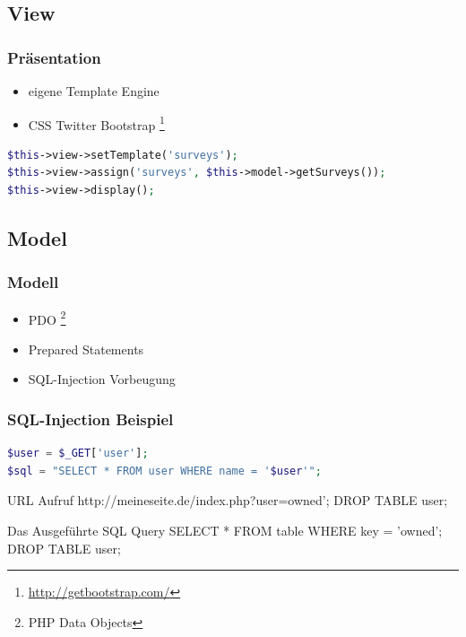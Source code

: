 \documentclass[xcolor=dvipsnames]{beamer}
\begin{document}
\subsection{View}
\begin{frame}[fragile] %
  \frametitle{Präsentation} %
  \begin{block}{}
	  \begin{itemize}
  		\item eigene Template Engine
  		\item CSS Twitter Bootstrap \footnote{\url{http://getbootstrap.com/}}
	  \end{itemize}
  \end{block}
  
\begin{lstlisting}[language=PHP, caption=Template Engine]
$this->view->setTemplate('surveys');
$this->view->assign('surveys', $this->model->getSurveys());
$this->view->display();
\end{lstlisting} 

\end{frame}

\subsection{Model}
\begin{frame} %
  \frametitle{Modell} %
  \begin{block}{}
	  \begin{itemize}
  		\item PDO \footnote{PHP Data Objects}
  		\item Prepared Statements
  		\item SQL-Injection Vorbeugung
	  \end{itemize}
  \end{block} 
\end{frame}

\begin{frame}[fragile] %
  \frametitle{SQL-Injection Beispiel} %

\begin{lstlisting}[language=PHP, caption=PHP Code der nicht Existieren sollte!!]
$user = $_GET['user'];
$sql = "SELECT * FROM user WHERE name = '$user'";
\end{lstlisting} 

\begin{block}{URL Aufruf}
http://meineseite.de/index.php?user=owned'; DROP TABLE user;
\end{block}
 
  \begin{alertblock}{Das Ausgeführte SQL Query}
SELECT * FROM table WHERE key = 'owned'; DROP TABLE user;
	\end{alertblock} 


\end{frame}
\end{document}
